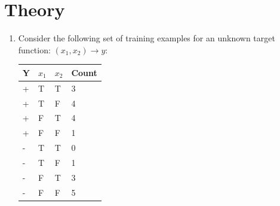 \documentclass[12pt]{article}
\begin{document}
\maketitle

\section{Theory}
\begin{enumerate}
\item Consider the following set of training examples for an unknown target function:  $(x_1, x_2)\rightarrow y$:
\begin{table}[h]
\begin{center}
\begin{tabular}{|l|l|l|l|}
\hline
Y & $x_1$ & $x_2$ & Count\\
\hline
+ & T & T & 3\\
+ & T & F & 4\\
+ & F & T & 4\\
+ & F & F & 1\\
- & T & T & 0\\
- & T & F & 1\\
- & F & T & 3\\
- & F & F & 5\\
\hline
\end{tabular}
\end{center}
\end{table}
	

\end{enumerate}
\end{document}
